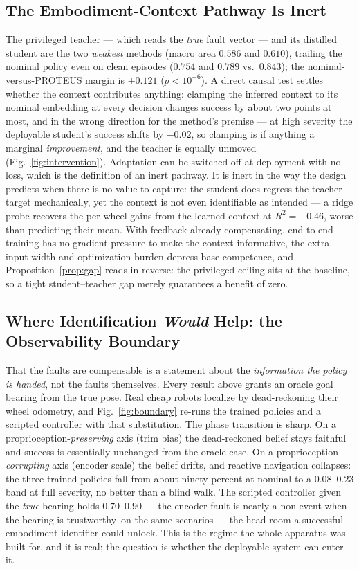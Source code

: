 \documentclass[journal]{IEEEtran}
\newcommand{\boundaryreactive}{the three trained policies fall from about
ninety percent at nominal to a $0.08$--$0.23$ band at full severity, no better
than a blind walk}
\newcommand{\boundaryoracle}{$0.70$--$0.90$ --- the encoder fault is nearly a
non-event when the bearing is trustworthy}
\begin{document}
\subsection{The Embodiment-Context Pathway Is Inert}\label{sec:inert}
The privileged teacher --- which reads the \emph{true} fault vector --- and its
distilled student are the two \emph{weakest} methods (macro area $0.586$ and
$0.610$), trailing the nominal policy even on clean episodes ($0.754$ and
$0.789$ vs.\ $0.843$); the nominal-versus-PROTEUS margin is
$+0.121$ ($p < 10^{-6}$). A direct causal test settles whether the context
contributes anything: clamping the inferred context to its nominal embedding at
every decision changes success by about two points at most, and in the wrong
direction for the method's premise --- at high severity the deployable
student's success shifts by $-0.02$, so clamping is if anything a marginal
\emph{improvement}, and the teacher is equally unmoved
(Fig.~\ref{fig:intervention}). Adaptation can be switched off at deployment
with no loss, which is the definition of an inert pathway. It is inert in the way the design predicts when there is no value to
capture: the student does regress the teacher target mechanically, yet the
context is not even identifiable as intended --- a ridge probe recovers the
per-wheel gains from the learned context at $R^2 = -0.46$, worse than
predicting their mean. With feedback already compensating, end-to-end training
has no gradient pressure to make the context informative, the extra input width
and optimization burden depress base competence, and
Proposition~\ref{prop:gap} reads in reverse: the privileged ceiling sits at the
baseline, so a tight student--teacher gap merely guarantees a benefit of zero.

\subsection{Where Identification \emph{Would} Help: the Observability Boundary}
\label{sec:obs}
That the faults are compensable is a statement about the \emph{information the
policy is handed}, not the faults themselves. Every result above grants an
oracle goal bearing from the true pose. Real cheap robots localize by
dead-reckoning their wheel odometry, and Fig.~\ref{fig:boundary} re-runs the
trained policies and a scripted controller with that substitution.
The phase transition is sharp. On a proprioception-\emph{preserving} axis
(trim bias) the dead-reckoned belief stays faithful and success is essentially
unchanged from the oracle case. On a proprioception-\emph{corrupting} axis
(encoder scale) the belief drifts, and reactive navigation collapses:
\boundaryreactive. The scripted controller given the \emph{true} bearing holds
\boundaryoracle\ on the same scenarios --- the head-room a successful embodiment
identifier could unlock. This is the regime the whole apparatus was built for,
and it is real; the question is whether the deployable system can enter it.
\end{document}
